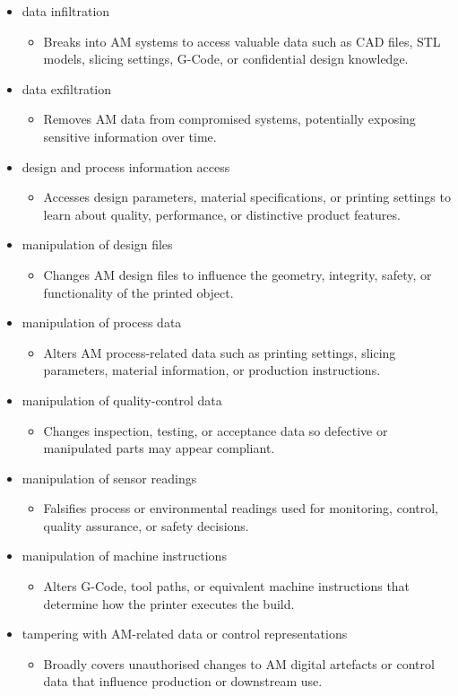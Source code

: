 \documentclass[10pt,a4paper,oneside]{report}
\begin{document}
\begin{itemize}
\item data infiltration
\begin{itemize}
\item Breaks into AM systems to access valuable data such as CAD files, STL models, slicing settings, G-Code, or confidential design knowledge.
\end{itemize}
\item data exfiltration
\begin{itemize}
\item Removes AM data from compromised systems, potentially exposing sensitive information over time.
\end{itemize}
\item design and process information access
\begin{itemize}
\item Accesses design parameters, material specifications, or printing settings to learn about quality, performance, or distinctive product features.
\end{itemize}
\item manipulation of design files
\begin{itemize}
\item Changes AM design files to influence the geometry, integrity, safety, or functionality of the printed object.
\end{itemize}
\item manipulation of process data
\begin{itemize}
\item Alters AM process-related data such as printing settings, slicing parameters, material information, or production instructions.
\end{itemize}
\item manipulation of quality-control data
\begin{itemize}
\item Changes inspection, testing, or acceptance data so defective or manipulated parts may appear compliant.
\end{itemize}
\item manipulation of sensor readings
\begin{itemize}
\item Falsifies process or environmental readings used for monitoring, control, quality assurance, or safety decisions.
\end{itemize}
\item manipulation of machine instructions
\begin{itemize}
\item Alters G-Code, tool paths, or equivalent machine instructions that determine how the printer executes the build.
\end{itemize}
\item tampering with AM-related data or control representations
\begin{itemize}
\item Broadly covers unauthorised changes to AM digital artefacts or control data that influence production or downstream use.
\end{itemize}
\end{itemize}
\end{document}
